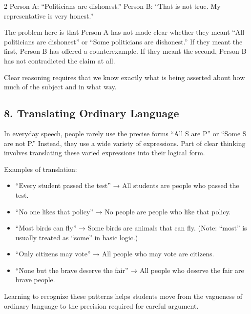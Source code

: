 \documentclass[12pt]{article}
\begin{document}
\begin{multicols}{2}
Person A: “Politicians are dishonest.”
Person B: “That is not true. My representative is very honest.”

The problem here is that Person A has not made clear whether they meant “All politicians are dishonest” or “Some politicians are dishonest.” If they meant the first, Person B has offered a counterexample. If they meant the second, Person B has not contradicted the claim at all.

Clear reasoning requires that we know exactly what is being asserted about how much of the subject and in what way.

\subsection*{8. Translating Ordinary Language}
In everyday speech, people rarely use the precise forms “All S are P” or “Some S are not P.” Instead, they use a wide variety of expressions. Part of clear thinking involves translating these varied expressions into their logical form.

Examples of translation:
\begin{itemize}
\item “Every student passed the test” → All students are people who passed the test.
\item “No one likes that policy” → No people are people who like that policy.
\item “Most birds can fly” → Some birds are animals that can fly. (Note: “most” is usually treated as “some” in basic logic.)
\item “Only citizens may vote” → All people who may vote are citizens.
\item “None but the brave deserve the fair” → All people who deserve the fair are brave people.
\end{itemize}

Learning to recognize these patterns helps students move from the vagueness of ordinary language to the precision required for careful argument.


\end{multicols}
\end{document}

